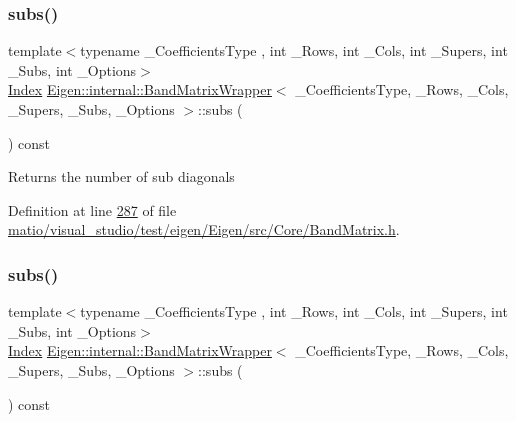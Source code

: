 \subsubsection{\texorpdfstring{subs()}{subs()}\hspace{0.1cm}{\footnotesize\ttfamily [1/2]}}
{\footnotesize\ttfamily template$<$typename \+\_\+\+Coefficients\+Type , int \+\_\+\+Rows, int \+\_\+\+Cols, int \+\_\+\+Supers, int \+\_\+\+Subs, int \+\_\+\+Options$>$ \\
\hyperlink{group___core___module_a554f30542cc2316add4b1ea0a492ff02}{Index} \hyperlink{class_eigen_1_1internal_1_1_band_matrix_wrapper}{Eigen\+::internal\+::\+Band\+Matrix\+Wrapper}$<$ \+\_\+\+Coefficients\+Type, \+\_\+\+Rows, \+\_\+\+Cols, \+\_\+\+Supers, \+\_\+\+Subs, \+\_\+\+Options $>$\+::subs (\begin{DoxyParamCaption}{ }\end{DoxyParamCaption}) const\hspace{0.3cm}{\ttfamily [inline]}}

\begin{DoxyReturn}{Returns}
the number of sub diagonals 
\end{DoxyReturn}


Definition at line \hyperlink{matio_2visual__studio_2test_2eigen_2_eigen_2src_2_core_2_band_matrix_8h_source_l00287}{287} of file \hyperlink{matio_2visual__studio_2test_2eigen_2_eigen_2src_2_core_2_band_matrix_8h_source}{matio/visual\+\_\+studio/test/eigen/\+Eigen/src/\+Core/\+Band\+Matrix.\+h}.

\mbox{\label{class_eigen_1_1internal_1_1_band_matrix_wrapper_a146d5ceb44c93c8e0a48c207ad252a8f}} 
\subsubsection{\texorpdfstring{subs()}{subs()}\hspace{0.1cm}{\footnotesize\ttfamily [2/2]}}
{\footnotesize\ttfamily template$<$typename \+\_\+\+Coefficients\+Type , int \+\_\+\+Rows, int \+\_\+\+Cols, int \+\_\+\+Supers, int \+\_\+\+Subs, int \+\_\+\+Options$>$ \\
\hyperlink{group___core___module_a554f30542cc2316add4b1ea0a492ff02}{Index} \hyperlink{class_eigen_1_1internal_1_1_band_matrix_wrapper}{Eigen\+::internal\+::\+Band\+Matrix\+Wrapper}$<$ \+\_\+\+Coefficients\+Type, \+\_\+\+Rows, \+\_\+\+Cols, \+\_\+\+Supers, \+\_\+\+Subs, \+\_\+\+Options $>$\+::subs (\begin{DoxyParamCaption}{ }\end{DoxyParamCaption}) const\hspace{0.3cm}{\ttfamily [inline]}}

